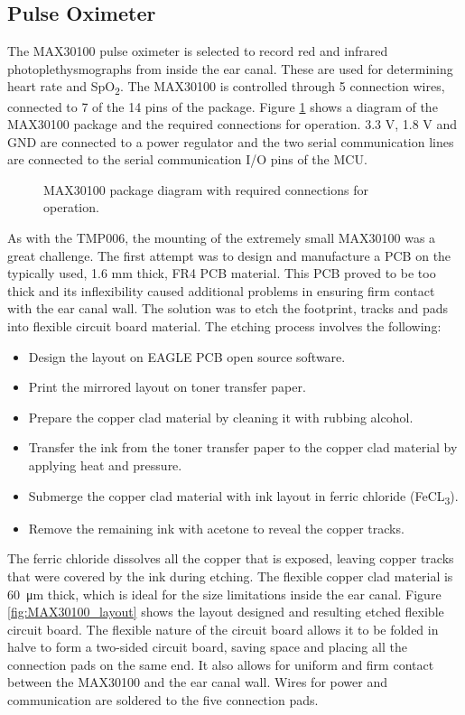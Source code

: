 \subsection{Pulse Oximeter}
The MAX30100 pulse oximeter is selected to record red and infrared photoplethysmographs from inside the ear canal. These are used for determining heart rate and SpO\textsubscript{2}. The MAX30100 is controlled through 5 connection wires, connected to 7 of the 14 pins of the package. Figure \ref{fig:MAX30100_pinout} shows a diagram of the MAX30100 package and the required connections for operation. 3.3 V, 1.8 V and GND are connected to a power regulator and the two serial communication lines are connected to the serial communication I/O pins of the MCU.

\begin{figure}[H]
\centering
\graphicspath{{figs/}}
\def\svgwidth{180pt}

\caption{MAX30100 package diagram with required connections for operation.}
\label{fig:MAX30100_pinout}
\end{figure}

As with the TMP006, the mounting of the extremely small MAX30100 was a great challenge. The first attempt was to design and manufacture a PCB on the typically used, 1.6 mm thick, FR4 PCB material. This PCB proved to be too thick and its inflexibility caused additional problems in ensuring firm contact with the ear canal wall. The solution was to etch the footprint, tracks and pads into flexible circuit board material. The etching process involves the following:
\begin{itemize}
\item Design the layout on EAGLE PCB open source software.
\item Print the mirrored layout on toner transfer paper.
\item Prepare the copper clad material by cleaning it with rubbing alcohol.
\item Transfer the ink from the toner transfer paper to the copper clad material by applying heat and pressure.
\item Submerge the copper clad material with ink layout in ferric chloride (FeCL\textsubscript{3}).
\item Remove the remaining ink with acetone to reveal the copper tracks.
\end{itemize} 

The ferric chloride dissolves all the copper that is exposed, leaving copper tracks that were covered by the ink during etching. The flexible copper clad material is \SI{60}{\micro\meter} thick, which is ideal for the size limitations inside the ear canal. Figure \ref{fig:MAX30100_layout} shows the layout designed and resulting etched flexible circuit board. The flexible nature of the circuit board allows it to be folded in halve to form a two-sided circuit board, saving space and placing all the connection pads on the same end. It also allows for uniform and firm contact between the MAX30100 and the ear canal wall. Wires for power and communication are soldered to the five connection pads.

